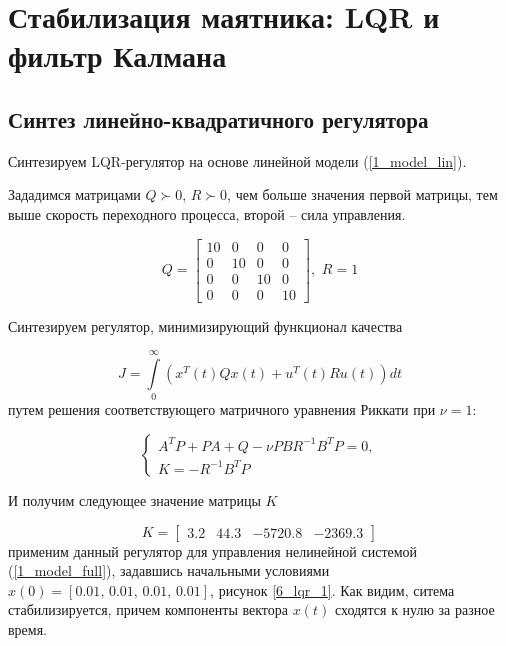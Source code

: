 \chapter{Стабилизация маятника: LQR и фильтр Калмана}
\label{ch:chap6}

\section{Синтез линейно-квадратичного регулятора}
Синтезируем LQR-регулятор на основе линейной модели (\ref{1_model_lin}).

Зададимся матрицами $Q \succ 0$, $R \succ 0$, чем больше значения первой матрицы, тем выше скорость переходного процесса, второй -- сила управления.

\begin{equation}
    Q = \begin{bmatrix}
10 & 0 & 0 & 0\\
0 & 10 & 0 & 0\\
0 & 0 & 10 & 0\\
0 & 0 & 0 & 10
    \end{bmatrix}, \, \, R = 1
\end{equation}

Синтезируем регулятор, минимизирующий функционал качества

\begin{equation}
	J = \int \limits_0^\infty (x^T(t)Qx(t) + u^T(t)Ru(t))dt
\end{equation}
путем решения соответствующего матричного уравнения Риккати при $\nu=1$:

\begin{equation}
	\begin{cases}
		A^TP+PA+Q-\nu PBR^{-1}B^TP = 0,\\
		K = -R^{-1}B^TP
	\end{cases}
\end{equation}

И получим следующее значение матрицы $K$

\begin{equation}
	K = \begin{bmatrix}
		3.2 &   44.3 &  -5720.8   &-2369.3
	\end{bmatrix}
\end{equation}
применим данный регулятор для управления нелинейной системой (\ref{1_model_full}), задавшись начальными условиями $x(0) = [0.01, \, 0.01, \, 0.01, \, 0.01]$, рисунок \ref{6_lqr_1}. Как видим, ситема стабилизируется, причем компоненты вектора $x(t)$ сходятся к нулю за разное время.

